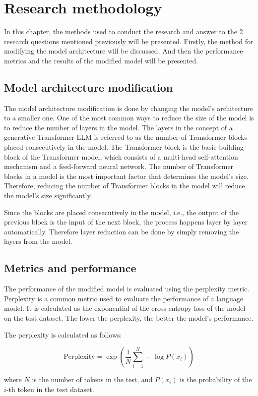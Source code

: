 \chapter{Research methodology}
In this chapter, the methods used to conduct the research and answer to the 2 research questions mentioned previously will be presented. Firstly, the method for modifying the model architecture will be discussed. And then the performance metrics and the results of the modified model will be presented.

\section{Model architecture modification}
The model architecture modification is done by changing the model's architecture to a smaller one. One of the most common ways to reduce the size of the model is to reduce the number of layers in the model. The layers in the concept of a generative Transformer LLM is referred to as the number of Transformer blocks placed consecutively in the model. The Transformer block is the basic building block of the Transformer model, which consists of a multi-head self-attention mechanism and a feed-forward neural network. The number of Transformer blocks in a model is the most important factor that determines the model's size. Therefore, reducing the number of Transformer blocks in the model will reduce the model's size significantly. \par 
Since the blocks are placed consecutively in the model, i.e., the output of the previous block is the input of the next block, the process happens layer by layer automatically. Therefore layer reduction can be done by simply removing the layers from the model. \par

\section{Metrics and performance}
The performance of the modified model is evaluated using the perplexity metric. Perplexity is a common metric used to evaluate the performance of a language model. It is calculated as the exponential of the cross-entropy loss of the model on the test dataset. The lower the perplexity, the better the model's performance. \par
The perplexity is calculated as follows:

\begin{equation*}
    \text{Perplexity} = \exp\left(\frac{1}{N}\sum_{i=1}^{N} -\log P(x_i)\right)
\end{equation*}
\begin{center}
    where $N$ is the number of tokens in the test, and $P(x_i)$ is the probability of the $i$-th token in the test dataset.
\end{center}

